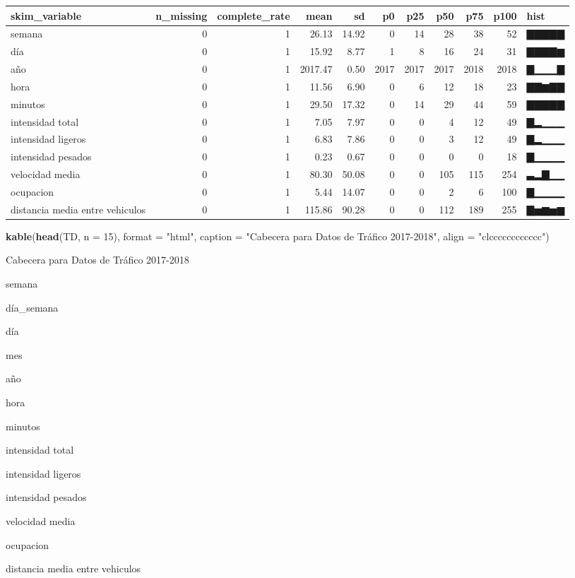 \documentclass[]{article}
\newenvironment{Shaded}{\begin{snugshade}}{\end{snugshade}}
\newcommand{\KeywordTok}[1]{\textcolor[rgb]{0.13,0.29,0.53}{\textbf{{#1}}}}
\newcommand{\DataTypeTok}[1]{\textcolor[rgb]{0.13,0.29,0.53}{{#1}}}
\newcommand{\DecValTok}[1]{\textcolor[rgb]{0.00,0.00,0.81}{{#1}}}
\newcommand{\StringTok}[1]{\textcolor[rgb]{0.31,0.60,0.02}{{#1}}}
\newcommand{\NormalTok}[1]{{#1}}
\begin{document}
\begin{longtable}[]{@{}lrrrrrrrrrl@{}}
\toprule
skim\_variable & n\_missing & complete\_rate & mean & sd & p0 & p25 &
p50 & p75 & p100 & hist\tabularnewline
\midrule
\endhead
semana & 0 & 1 & 26.13 & 14.92 & 0 & 14 & 28 & 38 & 52 &
▇▇▇▇▇\tabularnewline
día & 0 & 1 & 15.92 & 8.77 & 1 & 8 & 16 & 24 & 31 & ▇▇▇▇▆\tabularnewline
año & 0 & 1 & 2017.47 & 0.50 & 2017 & 2017 & 2017 & 2018 & 2018 &
▇▁▁▁▇\tabularnewline
hora & 0 & 1 & 11.56 & 6.90 & 0 & 6 & 12 & 18 & 23 &
▇▇▆▇▇\tabularnewline
minutos & 0 & 1 & 29.50 & 17.32 & 0 & 14 & 29 & 44 & 59 &
▇▇▇▇▇\tabularnewline
intensidad total & 0 & 1 & 7.05 & 7.97 & 0 & 0 & 4 & 12 & 49 &
▇▂▁▁▁\tabularnewline
intensidad ligeros & 0 & 1 & 6.83 & 7.86 & 0 & 0 & 3 & 12 & 49 &
▇▂▁▁▁\tabularnewline
intensidad pesados & 0 & 1 & 0.23 & 0.67 & 0 & 0 & 0 & 0 & 18 &
▇▁▁▁▁\tabularnewline
velocidad media & 0 & 1 & 80.30 & 50.08 & 0 & 0 & 105 & 115 & 254 &
▃▂▇▁▁\tabularnewline
ocupacion & 0 & 1 & 5.44 & 14.07 & 0 & 0 & 2 & 6 & 100 &
▇▁▁▁▁\tabularnewline
distancia media entre vehiculos & 0 & 1 & 115.86 & 90.28 & 0 & 0 & 112 &
189 & 255 & ▇▅▆▅▆\tabularnewline
\bottomrule
\end{longtable}

\begin{Shaded}
\begin{Highlighting}[]
\KeywordTok{kable}\NormalTok{(}\KeywordTok{head}\NormalTok{(TD, }\DataTypeTok{n =} \DecValTok{15}\NormalTok{), }
      \DataTypeTok{format  =} \StringTok{"html"}\NormalTok{, }
      \DataTypeTok{caption =} \StringTok{"Cabecera para Datos de Tráfico 2017-2018"}\NormalTok{,}
      \DataTypeTok{align   =} \StringTok{"clcccccccccccc"}\NormalTok{)}
\end{Highlighting}
\end{Shaded}

Cabecera para Datos de Tráfico 2017-2018

semana

día\_semana

día

mes

año

hora

minutos

intensidad total

intensidad ligeros

intensidad pesados

velocidad media

ocupacion

distancia media entre vehiculos
\end{document}
